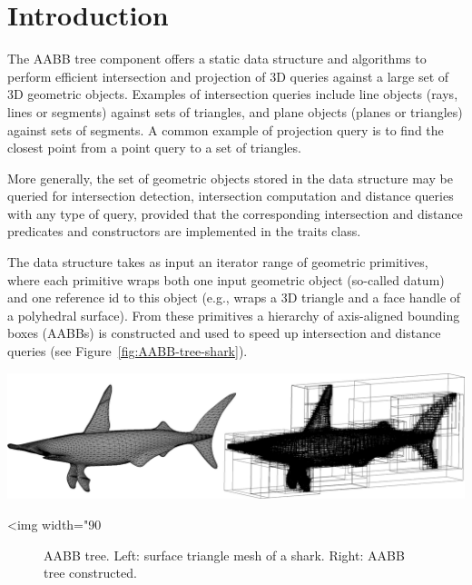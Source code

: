 \section{Introduction}
\label{AABB_tree_section_intro}

The AABB tree component offers a static data structure and algorithms to perform efficient intersection and projection of 3D queries against a large set of 3D geometric objects. Examples of intersection queries include line objects (rays, lines or segments) against sets of triangles, and plane objects (planes or triangles) against sets of segments. A common example of projection query is to find the closest point from a point query to a set of triangles.

More generally, the set of geometric objects stored in the data structure may be queried for intersection detection, intersection computation and distance queries with any type of query, provided that the corresponding intersection and distance predicates and constructors are implemented in the traits class. 

The data structure takes as input an iterator range of geometric primitives, where each primitive wraps both one input geometric object (so-called datum) and one reference id to this object (e.g., wraps a 3D triangle and a face handle of a polyhedral surface). From these primitives a hierarchy of axis-aligned bounding boxes (AABBs) is constructed and used to speed up intersection and distance queries (see Figure~\ref{fig:AABB-tree-shark}). 

\begin{center}
    \label{fig:AABB-tree-shark}
    \begin{ccTexOnly}
      \includegraphics[width=1.0\textwidth]{AABB_tree/shark}
    \end{ccTexOnly}
    \begin{ccHtmlOnly}
        <img width="90%
    \end{ccHtmlOnly}
    \begin{figure}[h]
        \caption{AABB tree.
                 Left: surface triangle mesh of a shark.
                 Right: AABB tree constructed.}
    \end{figure}
\end{center}
